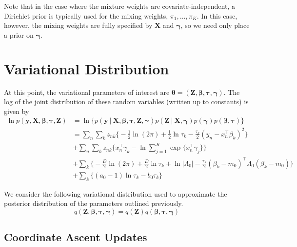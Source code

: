 \documentclass[twoside,11pt]{article}
\newcommand\given[1][]{\:#1\vert\:}
\newcommand{\transpose}[1]{#1^{\intercal}}
\newcommand{\nsum}{\sum_{n}}
\newcommand{\ksum}{\sum_{k}}
\newcommand{\boldbeta}{\boldsymbol\beta}
\newcommand{\boldgamma}{\boldsymbol\gamma}
\newcommand{\boldtau}{\boldsymbol\tau}
\newcommand{\sumexp}{\sum_{j=1}^{K} \exp \{ \transpose{x_n} \gamma_j \}}
\newcommand{\pr}[1]{p \left( #1 \right)}
\begin{document}
Note that in the case where the mixture weights are covariate-independent, a Dirichlet prior is typically used for the mixing weights, $\pi_1, \ldots, \pi_K$. In this case, however, the mixing weights are fully specified by $\mathbf{X}$ and $\boldgamma$, so we need only place a prior on $\boldgamma$. 


\section{Variational Distribution} \label{sec:variational}
At this point, the variational parameters of interest are $\boldsymbol \theta = (\mathbf{Z}, \boldbeta, \boldtau, \boldgamma)$. The log of the joint distribution of these random variables (written up to constants) is given by
\begin{equation} \label{eq:joint}
\begin{split}
	\ln  \pr{\mathbf{y}, \mathbf{X}, \boldbeta, \boldtau, \mathbf{Z}} &= 
	\ln \bigg\{\pr{\mathbf{y} \given \mathbf{X}, \boldsymbol\beta, \boldsymbol{\tau}, \mathbf{Z}, \boldsymbol\gamma}\pr{\mathbf{Z}\given \mathbf{X}, \boldgamma}\pr{\boldgamma}\pr{\boldbeta, \boldtau} \bigg\}\\
	&= \nsum \ksum z_{nk}\bigg\{ -\frac{1}{2}\ln(2\pi) + \frac{1}{2} \ln \tau_k - \frac{\tau_k}{2} \left( y_n - \transpose{x_n}\beta_k\right)^2 \bigg\} \\
	& + \nsum \ksum z_{nk} \bigg\{ \transpose{x_n} \gamma_k - \ln \sumexp  \bigg\} \\
	& + \ksum  \bigg\{ -\frac{D}{2} \ln (2\pi) + \frac{D}{2} \ln \tau_k + \ln | \Lambda_0| - \frac{\tau_k}{2}\transpose{(\beta_k - m_0)} \Lambda_0 (\beta_k - m_0)\bigg\} \\
	& + \ksum \bigg\{ (a_0 - 1) \ln \tau_k - b_0 \tau_k \bigg\}
\end{split}
\end{equation}

We consider the following variational distribution used to approximate the posterior distribution of the parameters outlined previously.
\begin{equation} \label{eq:variational}
	q \left( \mathbf{Z}, \boldbeta, \boldtau, \boldgamma \right) = q(\mathbf{Z}) q(\boldbeta, \boldtau, \boldgamma)
\end{equation}

\subsection{Coordinate Ascent Updates} \label{sec:cavi}
\end{document}
